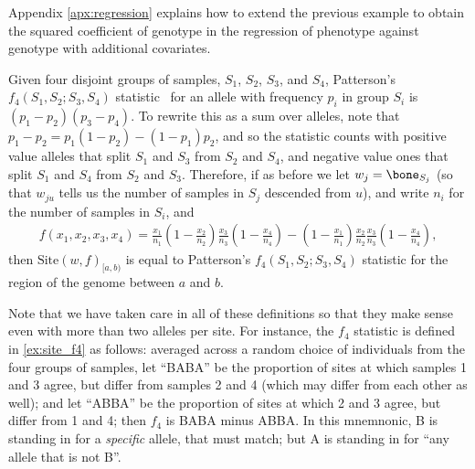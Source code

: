 \documentclass{article}
\newcommand{\site}{\mbox{Site}} %
\newcommand{\iw}{w} %
\begin{document}
Appendix \ref{apx:regression} explains how to extend the previous example
to obtain the squared coefficient of genotype in the regression of phenotype
against genotype with additional covariates.

\begin{example}[Patterson's $f_4$] \label{ex:site_f4}
    Given four disjoint groups of samples, $S_1$, $S_2$, $S_3$, and $S_4$,
    Patterson's $f_4(S_1, S_2; S_3, S_4)$
    statistic~\citep{reich2009reconstructing,patterson2012ancient}
    for an allele with frequency $p_i$ in group $S_i$
    is $(p_1 - p_2)(p_3 - p_4)$. To rewrite this as a sum over alleles, note that
    $p_1 - p_2 = p_1 (1 - p_2) - (1 - p_1) p_2$,
    and so the statistic counts with positive value
    alleles that split $S_1$ and $S_3$ from $S_2$ and $S_4$,
    and negative value ones that split $S_1$ and $S_4$ from $S_2$ and $S_3$.
    Therefore, if as before we
    let $\iw_j = \bone_{S_j}$
    (so that $\iw_{ju}$ tells us the number of samples in $S_j$ descended from $u$),
    and write $n_i$ for the number of samples in $S_i$, and
    \begin{align*}
        f(x_1, x_2, x_3, x_4)
        =
        \frac{x_1}{n_1}
        \left(1 - \frac{x_2}{n_2}\right)
        \frac{x_3}{n_3}
        \left(1 - \frac{x_4}{n_4}\right)
        -
        \left(1 - \frac{x_1}{n_1}\right)
        \frac{x_2}{n_2}
        \frac{x_3}{n_3}
        \left(1 - \frac{x_4}{n_4}\right),
    \end{align*}
    then $\site(\iw, f)_{[a,b)}$ is equal to Patterson's $f_4(S_1, S_2; S_3, S_4)$ statistic
    for the region of the genome between $a$ and $b$.
\end{example}

Note that we have taken care in all of these definitions
so that they make sense even with more than two alleles per site.
For instance, the $f_4$ statistic is defined in \autoref{ex:site_f4} as follows:
averaged across a random choice of individuals from the four groups of samples,
let ``BABA'' be the proportion of sites at which samples 1 and 3 agree,
but differ from samples 2 and 4 (which may differ from each other as well);
and let ``ABBA'' be the proportion of sites at which 2 and 3 agree, but differ from 1 and 4;
then $f_4$ is BABA minus ABBA.
In this mnemnonic, B is standing in for a \emph{specific} allele, that must match;
but A is standing in for ``any allele that is not B''.
\end{document}
